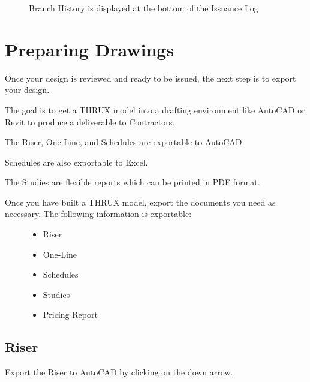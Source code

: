 \documentclass[letterpaper,10pt,english]{sphinxmanual}
\begin{document}
\begin{figure}[H]
\centering
\capstart

\noindent{}
\caption{Branch History is displayed at the bottom of the Issuance Log}\label{\detokenize{index:id4}}\end{figure}


\chapter{Preparing Drawings}
\label{\detokenize{index:preparing-drawings}}
Once your design is reviewed and ready to be issued, the next step is to export your design.

The goal is to get a THRUX model into a drafting environment like AutoCAD or Revit to produce a deliverable to Contractors.

The Riser, One-Line, and Schedules are exportable to AutoCAD.

Schedules are also exportable to Excel.

The Studies are flexible reports which can be printed in PDF format.
\begin{description}
\item[{Once you have built a THRUX model, export the documents you need as necessary.  The following information is exportable:}] \leavevmode\begin{itemize}
\item {} 
Riser

\item {} 
One-Line

\item {} 
Schedules

\item {} 
Studies

\item {} 
Pricing Report

\end{itemize}

\end{description}

\newpage


\section{Riser}
\label{\detokenize{index:riser}}
Export the Riser to AutoCAD by clicking on the down arrow.

\begin{figure}[H]
\centering

\noindent{}
\end{figure}
\end{document}
